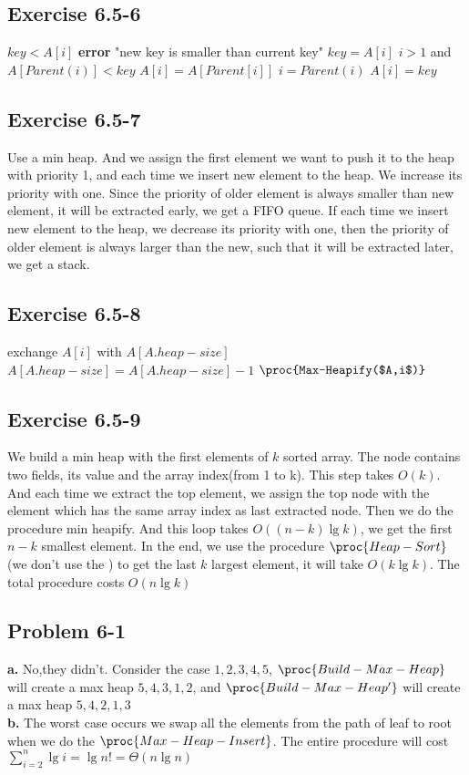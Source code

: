\documentclass[12pt]{article}
\theoremstyle{definition}
\theoremstyle{remark}
\begin{document}
\subsection*{Exercise 6.5-6}
\begin{codebox}
\li \If $key<A[i]$
\li \quad \textbf{error} "new key is smaller than current key"
\li $key=A[i]$
\li \While $i>1$ and $A[Parent(i)]<key$
\li \quad $A[i]=A[Parent[i]]$
\li \quad $i=Parent(i)$
\li $A[i]=key$
\end{codebox}
\subsection*{Exercise 6.5-7}
Use a min heap. And we assign the first element we want to push it to the heap with priority 1, and each time we insert new element to the heap. We increase its priority with one. Since the priority of older element is always smaller than new element, it will be extracted early, we get a FIFO queue. If each time we insert new element to the heap, we decrease its priority with one, then the priority of older element is always larger than the new, such that it will be extracted later, we get a stack.
\subsection*{Exercise 6.5-8}
\begin{codebox}
\li exchange $A[i]$ with $A[A.heap-size]$
\li $A[A.heap-size]=A[A.heap-size]-1$
\li $\proc{Max-Heapify($A,i$)}$
\end{codebox}
\subsection*{Exercise 6.5-9}
We build a min heap with the first elements of $k$ sorted array. The node contains two fields, its value and the array index(from 1 to k). This step takes $O(k)$. And each time we extract the top element, we assign the top node with the element which has the same array index as last extracted node. Then we do the procedure min heapify. And this loop takes $O((n-k)\lg{k})$, we get the first $n-k$ smallest element. In the end, we use the procedure $\proc{Heap-Sort}$(we don't use the ) to get the last $k$ largest element, it will take $O(k\lg{k})$. The total procedure costs $O(n\lg{k})$
\subsection*{Problem 6-1}
\textbf{a.} No,they didn't. Consider the case $1,2,3,4,5$, $\proc{Build-Max-Heap}$ will create a max heap $5,4,3,1,2$, and $\proc{Build-Max-Heap'}$ will create a max heap $5,4,2,1,3$\\
\textbf{b.} The worst case occurs we swap all the elements from the path of leaf to root when we do the $\proc{Max-Heap-Insert}$. The entire procedure will cost $\sum_{i=2}^n\lg{i}=\lg{n!}=\Theta(n\lg{n})$
\end{document}
